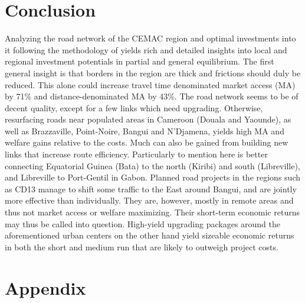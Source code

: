 \documentclass[a4paper]{article}
\begin{document}
\hphantom{a}
\newpage

\section{Conclusion} 

Analyzing the road network of the CEMAC region and optimal investments into it following the methodology of \citet{krantz2024optimal} yields rich and detailed insights into local and regional investment potentials in partial and general equilibrium. The first general insight is that borders in the region are thick and frictions should duly be reduced. This alone could increase travel time denominated market access (MA) by 71\% and distance-denominated MA by 43\%. The road network seems to be of decent quality, except for a few links which need upgrading. Otherwise, resurfacing roads near populated areas in Cameroon (Douala and Yaounde), as well as Brazzaville, Point-Noire, Bangui and N'Djamena, yields high MA and welfare gains relative to the costs. Much can also be gained from building new links that increase route efficiency. Particularly to mention here is better connecting Equatorial Guinea (Bata) to the north (Kiribi) and south (Libreville), and Libreville to Port-Gentil in Gabon. Planned road projects in the regions such as CD13 manage to shift some traffic to the East around Bangui, and are jointly more effective than individually. They are, however, mostly in remote areas and thus not market access or welfare maximizing. Their short-term economic returns may thus be called into question. High-yield upgrading packages around the aforementioned urban centers on the other hand yield sizeable economic returns in both the short and medium run that are likely to outweigh project costs.  %


\newpage



\newpage
\section*{Appendix}
\end{document}
